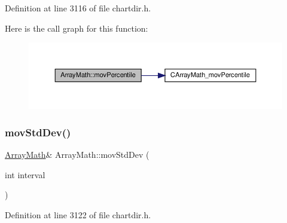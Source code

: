 Definition at line 3116 of file chartdir.\+h.

Here is the call graph for this function\+:
\nopagebreak
\begin{figure}[H]
\begin{center}
\leavevmode
\includegraphics[width=350pt]{class_array_math_adc007aad3ce9cac15f02159190c2c84a_cgraph}
\end{center}
\end{figure}
\mbox{\label{class_array_math_a0352f506e872e964ef2590fa7e8ce581}} 
\subsubsection{\texorpdfstring{mov\+Std\+Dev()}{movStdDev()}}
{\footnotesize\ttfamily \hyperlink{class_array_math}{Array\+Math}\& Array\+Math\+::mov\+Std\+Dev (\begin{DoxyParamCaption}\item[{int}]{interval }\end{DoxyParamCaption})\hspace{0.3cm}{\ttfamily [inline]}}



Definition at line 3122 of file chartdir.\+h.

